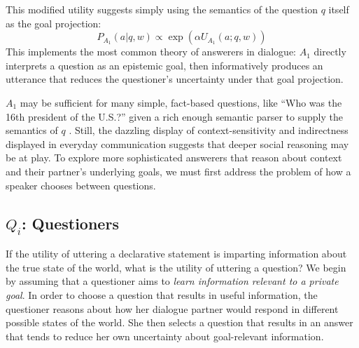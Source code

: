 \documentclass[12pt, floatsintext, jou]{apa6}
\begin{document}
This modified utility suggests simply using the semantics of the question $q$ itself as the goal projection:
$$P_{A_1}(a|q,w) \propto \exp(\alpha U_{A_1}(a; q,w))$$
This implements the most common theory of answerers in dialogue: $A_1$ directly interprets a question as an epistemic goal, then informatively produces an utterance that reduces the questioner's uncertainty under that goal projection. 

$A_1$ may be sufficient for many simple, fact-based questions, like ``Who was the 16th president of the U.S.?'' given a rich enough semantic parser to supply the semantics of $q$ \cite{BerantChouFrostigLiang13_FreebaseQAPairs}. Still, the dazzling display of context-sensitivity and indirectness displayed in everyday communication suggests that deeper social reasoning may be at play. To explore more sophisticated answerers that reason about context and their partner's underlying goals, we must first address the problem of how a speaker chooses between questions.

\subsection{$Q_i$: Questioners}

If the utility of uttering a declarative statement is imparting information about the true state of the world, what is the utility of uttering a question? We begin by assuming that a questioner aims to \emph{learn information relevant to a private goal}.
%
In order to choose a question that results in useful information, the questioner reasons about how her dialogue partner would respond in different possible states of the world. She then selects a question that results in an answer that tends to reduce her own uncertainty about goal-relevant information.
%

\end{document}
